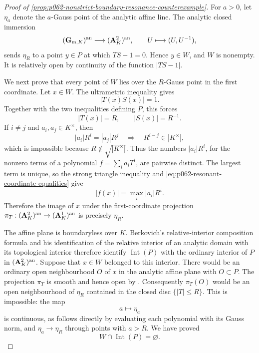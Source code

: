 
\begin{proof}[Proof of
\cref{prop:p062-nonstrict-boundary-resonance-counterexample}]
For \(a>0\), let \(\eta_a\) denote the \(a\)-Gauss point of the analytic
affine line.  The analytic closed immersion
\[
 (\mathbf G_{\mathrm m,K})^{\mathrm{an}}\longrightarrow(\mathbf A^2_K)^{\mathrm{an}},
             \qquad U\longmapsto(U,U^{-1}),
\]
sends \(\eta_R\) to a point \(y\in P\) at which \(TS-1=0\).  Hence
\(y\in W\), and \(W\) is nonempty.  It is relatively open by continuity
of the function \(|TS-1|\).

We next prove that every point of \(W\) lies over the \(R\)-Gauss point in
the first coordinate.  Let \(x\in W\).  The ultrametric inequality gives
\[
                         |T(x)S(x)|=1.
\]
Together with the two inequalities defining \(P\), this forces
\begin{equation}\label{eq:p062-resonant-coordinate-equalities}
                         |T(x)|=R,
                         \qquad |S(x)|=R^{-1}.
\end{equation}
If \(i\ne j\) and \(a_i,a_j\in K^\times\), then
\[
 |a_i|R^i=|a_j|R^j
       \quad\Longrightarrow\quad
 R^{i-j}\in|K^\times|,
\]
which is impossible because \(R\notin\sqrt{|K^\times|}\).  Thus the
numbers \(|a_i|R^i\), for the nonzero terms of a polynomial
\(f=\sum_i a_iT^i\), are pairwise distinct.  The largest term is unique,
so the strong triangle inequality and
\eqref{eq:p062-resonant-coordinate-equalities} give
\begin{equation}\label{eq:p062-resonant-gauss-restriction}
                         |f(x)|=\max_i|a_i|R^i.
\end{equation}
Therefore the image of \(x\) under the first-coordinate projection
\(
 \pi_T:(\mathbf A^2_K)^{\mathrm{an}}\to(\mathbf A^1_K)^{\mathrm{an}}
\)
is precisely \(\eta_R\).

The affine plane is boundaryless over \(K\).  Berkovich's relative-interior
composition formula and his identification of the relative interior of an
analytic domain with its topological interior
\cite[Proposition~1.5.5(i)--(ii)]{Berk93} therefore identify
\(\operatorname{Int}(P)\) with the ordinary interior of \(P\) in
\((\mathbf A^2_K)^{\mathrm{an}}\).  Suppose that \(x\in W\) belonged to this
interior.  There would be an ordinary open neighbourhood \(O\) of \(x\)
in the analytic affine plane with \(O\subset P\).  The projection
\(\pi_T\) is smooth and hence open by
\cite[Corollary~3.7.4]{Berk93}.  Consequently \(\pi_T(O)\) would be an
open neighbourhood of \(\eta_R\) contained in the closed disc
\(\{|T|\leq R\}\).  This is impossible: the map
\[
                    a\longmapsto\eta_a
\]
is continuous, as follows directly by evaluating each polynomial with its
Gauss norm, and \(\eta_a\to\eta_R\) through points with \(a>R\).  We have
proved
\begin{equation}\label{eq:p062-resonant-tube-in-boundary}
                    W\cap\operatorname{Int}(P)=\varnothing.
\end{equation}


\end{proof}
